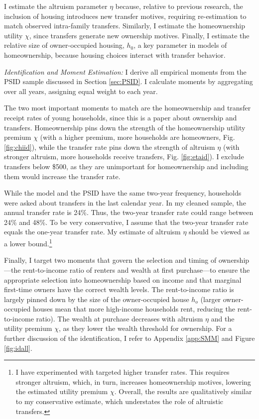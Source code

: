 \documentclass[12pt]{article}
\begin{document}
I estimate the altruism parameter $\eta$ because, relative to previous research, the inclusion of housing introduces new transfer motives, requiring re-estimation to match observed intra-family transfers. Similarly, I estimate the homeownership utility $\chi$, since transfers generate new ownership motives. Finally, I estimate the relative size of owner-occupied housing, $h_0$, a key parameter in models of homeownership, because housing choices interact with transfer behavior.

\textit{Identification and Moment Estimation:}
I derive all empirical moments from the PSID sample discussed in Section \ref{sec:PSID}. I calculate moments by aggregating over all years, assigning equal weight to each year.

The two most important moments to match are the homeownership and transfer receipt rates of young households, since this is a paper about ownership and transfers. Homeownership pins down the strength of the homeownership utility premium $\chi$ (with a higher premium, more households are homeowners, Fig. \ref{fig:chiid}), while the transfer rate pins down the strength of altruism $\eta$ (with stronger altruism, more households receive transfers, Fig. \ref{fig:etaid}). I exclude transfers below \$500, as they are unimportant for homeownership and including them would increase the transfer rate.

While the model and the PSID have the same two-year frequency, households were asked about transfers in the last calendar year. In my cleaned sample, the annual transfer rate is 24\%. Thus, the two-year transfer rate could range between 24\% and 48\%. To be very conservative, I assume that the two-year transfer rate equals the one-year transfer rate. My estimate of altruism $\eta$ should be viewed as a lower bound.\footnote{I have experimented with targeted higher transfer rates. This requires stronger altruism, which, in turn, increases homeownership motives, lowering the estimated utility premium $\chi$. Overall, the results are qualitatively similar to my conservative estimate, which understates the role of altruistic transfers.}

Finally, I target two moments that govern the selection and timing of ownership---the rent-to-income ratio of renters and wealth at first purchase---to ensure the appropriate selection into homeownership based on income and that marginal first-time owners have the correct wealth levels. The rent-to-income ratio is largely pinned down by the size of the owner-occupied house $h_o$ (larger owner-occupied houses mean that more high-income households rent, reducing the rent-to-income ratio). The wealth at purchase decreases with altruism $\eta$ and the utility premium $\chi$, as they lower the wealth threshold for ownership. For a further discussion of the identification, I refer to Appendix \ref{app:SMM} and Figure \ref{fig:idall}.
\end{document}
